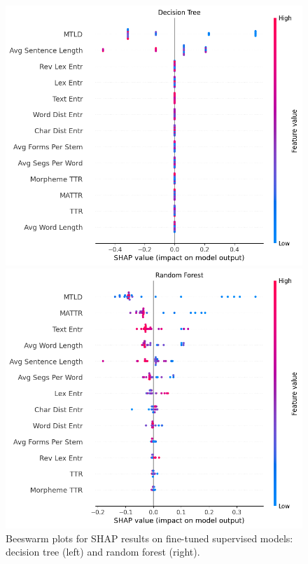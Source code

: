 \documentclass[12pt,a4paper]{article}
\numberwithin{figure}{section}
\numberwithin{table}{section}
\numberwithin{definition}{section}
\begin{document}
\begin{figure}[!h]
  \centering
  \begin{minipage}{0.5\textwidth}
    \includegraphics[width=\textwidth]{DT_SHAP_values.png}
  \end{minipage}\hfill
  \begin{minipage}{0.5\textwidth}
    \includegraphics[width=\textwidth]{RF_SHAP_values.png}
  \end{minipage}
    \caption{Beeswarm plots for SHAP results on fine-tuned supervised models: decision tree (left) and random forest (right).}
    \label{fig:supervisedshap}
\end{figure}
\end{document}

